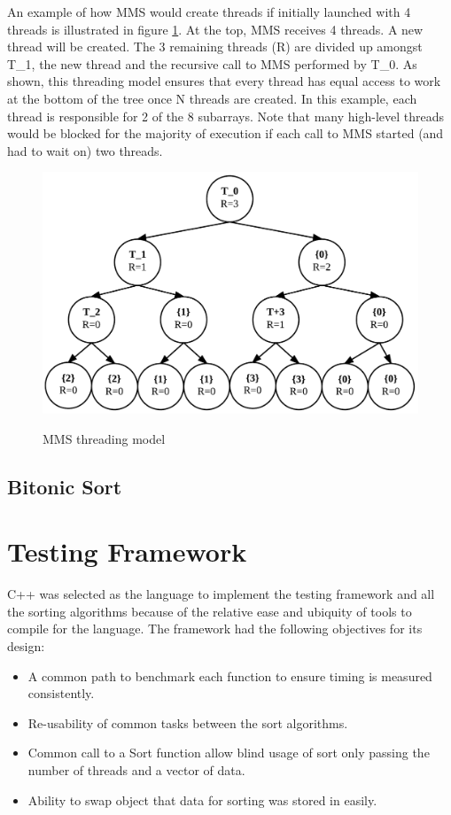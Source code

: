 \documentclass[journal]{IEEEtran}
\begin{document}
An example of how MMS would create threads if initially launched with 4 threads is illustrated in figure \ref{mms_thread}.  At the top, MMS receives 4 threads. A new thread will be created.  The 3 remaining threads (R) are divided up amongst T\_1, the new thread and the recursive call to MMS performed by T\_0.  As shown, this threading model ensures that every thread has equal access to work at the bottom of the tree once N threads are created.  In this example, each thread is responsible for 2 of the 8 subarrays.  Note that many high-level threads would be blocked for the majority of execution if each call to MMS started (and had to wait on) two threads.

\begin{figure}[H]
\caption{MMS threading model}
\includegraphics[width=.5\textwidth]{include/mms.png}
\label{mms_thread}
\end{figure}

\subsection{Bitonic Sort}

\section{Testing Framework}
\label{sec:testing}

C++ was selected as the language to implement the testing framework and all the sorting algorithms because of the relative ease and ubiquity of tools to compile for the language. The framework had the following objectives for its design:

\begin{itemize}
\item A common path to benchmark each function to ensure timing is measured consistently.
\item Re-usability of common tasks between the sort algorithms.
\item Common call to a Sort function allow blind usage of sort only passing the number of threads and a vector of data.
\item Ability to swap object that data for sorting was stored in easily.
\end{itemize}
\end{document}
